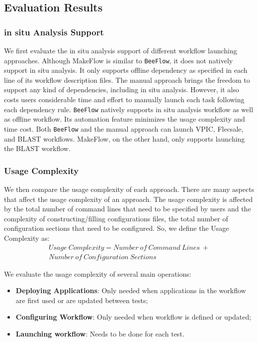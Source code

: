 \subsection{Evaluation Results}
\subsubsection{in situ Analysis Support}
We first evaluate the in situ analysis support of different workflow launching approaches. Although MakeFlow is similar to \texttt{BeeFlow}, it does not natively support in situ analysis. It only supports offline dependency as specified in each line of its workflow description files. The manual approach brings the freedom to support any kind of dependencies, including in situ analysis. However, it also costs users considerable time and effort to manually launch each task following each dependency rule. \texttt{BeeFlow} natively supports in situ analysis workflow as well as offline workflow. Its automation feature minimizes the usage complexity and time cost. Both \texttt{BeeFlow} and the manual approach can launch VPIC, Flecsale, and BLAST workflows. MakeFlow, on the other hand, only supports launching the BLAST workflow.


\subsubsection{Usage Complexity}
We then compare the usage complexity of each approach. There are many aspects that affect the usage complexity of an approach. The usage complexity is affected by the total number of command lines that need to be specified by users  and the complexity of constructing/filling configurations files, the total number of configuration sections that need to be configured. So, we define the Usage Complexity as:
\begin{align}
Usage\ Complexity = \nonumber 
Number\ of\ Command\ Lines\ + \\ \nonumber 
Number\ of\ Configuration\ Sections \nonumber 
\end{align}

We evaluate the usage complexity of several main operations:
\begin{itemize}
\item \textbf{Deploying Applications}: Only needed when applications in the workflow are first used or are updated between tests;
\item \textbf{Configuring Workflow}: Only needed when workflow is defined or updated;
\item \textbf{Launching workflow}: Needs to be done for each test.
\end{itemize}

